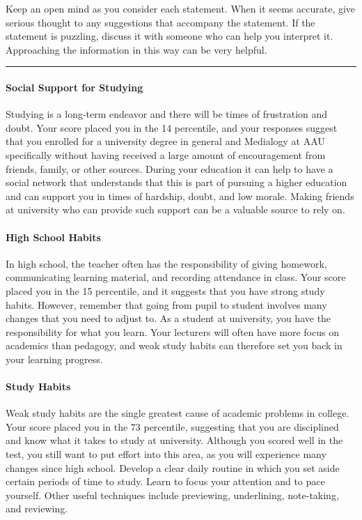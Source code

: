 \documentclass[]{article}
\let\oldparagraph\paragraph
\renewcommand{\paragraph}[1]{\oldparagraph{#1}\mbox{}}
\begin{document}
Keep an open mind as you consider each statement. When it seems
accurate, give serious thought to any suggestions that accompany the
statement. If the statement is puzzling, discuss it with someone who can
help you interpret it. Approaching the information in this way can be
very helpful.

\begin{center}\rule{0.5\linewidth}{\linethickness}\end{center}

\paragraph{Social Support for
Studying}\label{social-support-for-studying}

Studying is a long-term endeavor and there will be times of frustration
and doubt. Your score placed you in the 14 percentile, and your
responses suggest that you enrolled for a university degree in general
and Medialogy at AAU specifically without having received a large amount
of encouragement from friends, family, or other sources. During your
education it can help to have a social network that understands that
this is part of pursuing a higher education and can support you in times
of hardship, doubt, and low morale. Making friends at university who can
provide such support can be a valuable source to rely on.

\paragraph{High School Habits}\label{high-school-habits}

In high school, the teacher often has the responsibility of giving
homework, communicating learning material, and recording attendance in
class. Your score placed you in the 15 percentile, and it suggests that
you have strong study habits. However, remember that going from pupil to
student involves many changes that you need to adjust to. As a student
at university, you have the responsibility for what you learn. Your
lecturers will often have more focus on academics than pedagogy, and
weak study habits can therefore set you back in your learning progress.

\paragraph{Study Habits}\label{study-habits}

Weak study habits are the single greatest cause of academic problems in
college. Your score placed you in the 73 percentile, suggesting that you
are disciplined and know what it takes to study at university. Although
you scored well in the test, you still want to put effort into this
area, as you will experience many changes since high school. Develop a
clear daily routine in which you set aside certain periods of time to
study. Learn to focus your attention and to pace yourself. Other useful
techniques include previewing, underlining, note-taking, and reviewing.
\end{document}
